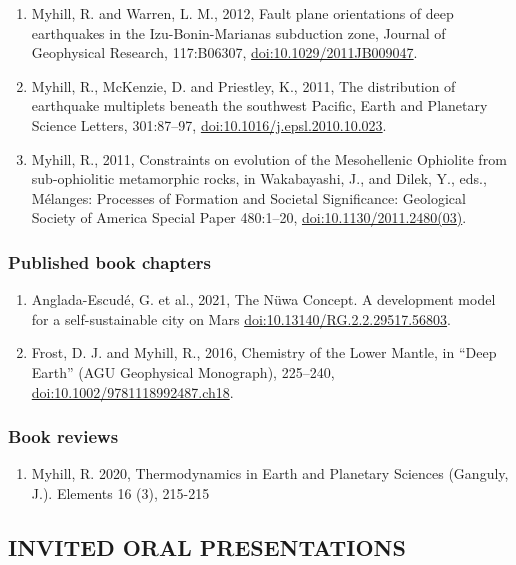 \documentclass[11pt,twoside,a4paper]{article}
\newcommand{\doi}[1]{\href{http://dx.doi.org/#1}{doi:#1}}
\begin{document}
\begin{enumerate}
\item Myhill, R. and Warren, L. M., 2012, Fault plane orientations of deep earthquakes in the Izu-Bonin-Marianas subduction zone, Journal of Geophysical Research, 117:B06307, \doi{10.1029/2011JB009047}.
\item Myhill, R., McKenzie, D. and Priestley, K., 2011, The distribution of earthquake multiplets beneath the southwest Pacific, Earth and Planetary Science Letters, 301:87--97, \doi{10.1016/j.epsl.2010.10.023}.
\item Myhill, R., 2011, Constraints on evolution of the Mesohellenic Ophiolite from sub-ophiolitic metamorphic rocks, in Wakabayashi, J., and Dilek, Y., eds., M\'elanges: Processes of Formation and Societal Significance: Geological Society of America Special Paper 480:1--20, \doi{10.1130/2011.2480(03)}.
\end{enumerate}

\subsubsection*{Published book chapters}
\begin{enumerate}
 \item Anglada-Escud\'{e}, G. et al., 2021, The N\"{u}wa Concept. A development model for a self-sustainable city on Mars \doi{10.13140/RG.2.2.29517.56803}.
 \item Frost, D. J. and Myhill, R., 2016, Chemistry of the Lower Mantle, in ``Deep Earth'' (AGU Geophysical Monograph), 225--240, \doi{10.1002/9781118992487.ch18}.
\end{enumerate}

\subsubsection*{Book reviews}
\begin{enumerate}
\item Myhill, R. 2020, Thermodynamics in Earth and Planetary Sciences (Ganguly, J.). Elements 16 (3), 215-215
\end{enumerate}

\clearpage
\subsection*{INVITED ORAL PRESENTATIONS}
\end{document}

